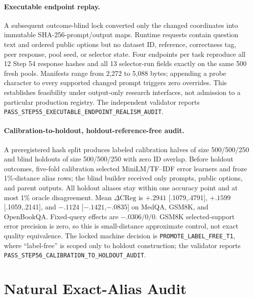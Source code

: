 \paragraph{Executable endpoint replay.}
A subsequent outcome-blind lock converted only the changed coordinates into immutable SHA-256-prompt/output maps. Runtime requests contain question text and ordered public options but no dataset ID, reference, correctness tag, peer response, pool seed, or selector state. Four endpoints per task reproduce all 12 Step 54 response hashes and all 13 selector-run fields exactly on the same 500 fresh pools. Manifests range from 2,272 to 5,088 bytes; appending a probe character to every supported changed prompt triggers zero overrides. This establishes feasibility under output-only research interfaces, not admission to a particular production registry. The independent validator reports \texttt{PASS\_STEP55\_EXECUTABLE\_ENDPOINT\_REALISM\_AUDIT}.

\paragraph{Calibration-to-holdout, holdout-reference-free audit.}
A preregistered hash split produces labeled calibration halves of size 500/500/250 and blind holdouts of size 500/500/250 with zero ID overlap. Before holdout outcomes, five-fold calibration selected MiniLM/TF--IDF error learners and froze 1\%-distance alias rows; the blind builder received only prompts, public options, and parent outputs. All holdout aliases stay within one accuracy point and at most 1\% oracle disagreement. Mean $\Delta\mathrm{CReg}$ is $+.2941$ [.1079,.4791], $+.1599$ [.1059,.2141], and $-.1124$ [$-.1421$,$-.0835$] on MedQA, GSM8K, and OpenBookQA. Fixed-query effects are $-.0306/0/0$. GSM8K selected-support error precision is zero, so this is small-distance approximate control, not exact quality equivalence. The locked machine decision is \texttt{PROMOTE\_LABEL\_FREE\_T1}, where ``label-free'' is scoped only to holdout construction; the validator reports \texttt{PASS\_STEP56\_CALIBRATION\_TO\_HOLDOUT\_AUDIT}.

\section{Natural Exact-Alias Audit}
\label{app:natural}

